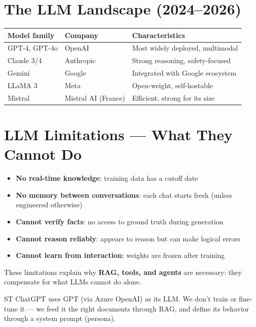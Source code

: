 \documentclass[11pt,a4paper]{report}
\begin{document}
\section{The LLM Landscape (2024--2026)}

\begin{table}[h]
\centering
\begin{tabularx}{\textwidth}{l l X}
\toprule
\textbf{Model family} & \textbf{Company} & \textbf{Characteristics} \\
\midrule
GPT-4, GPT-4o & OpenAI & Most widely deployed, multimodal \\
Claude 3/4 & Anthropic & Strong reasoning, safety-focused \\
Gemini & Google & Integrated with Google ecosystem \\
LLaMA 3 & Meta & Open-weight, self-hostable \\
Mistral & Mistral AI (France) & Efficient, strong for its size \\
\bottomrule
\end{tabularx}
\end{table}

\section{LLM Limitations --- What They Cannot Do}

\begin{itemize}
    \item \textbf{No real-time knowledge}: training data has a cutoff date
    \item \textbf{No memory between conversations}: each chat starts fresh (unless engineered otherwise)
    \item \textbf{Cannot verify facts}: no access to ground truth during generation
    \item \textbf{Cannot reason reliably}: appears to reason but can make logical errors
    \item \textbf{Cannot learn from interaction}: weights are frozen after training
\end{itemize}

These limitations explain why \textbf{RAG, tools, and agents} are necessary: they compensate for what LLMs cannot do alone.

\begin{projectbox}
ST ChatGPT uses GPT (via Azure OpenAI) as its LLM. We don't train or fine-tune it --- we feed it the right documents through RAG, and define its behavior through a system prompt (persona).
\end{projectbox}
\end{document}
